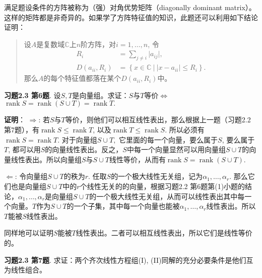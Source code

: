 满足题设条件的方阵被称为（强）对角优势矩阵（diagonally dominant matrix）。这样的矩阵都是非奇异的。如果学了方阵{\color{red}特征值}的知识，此题还可以利用如下结论证明：

\begin{quote}
设$A$是复数域$\mathbb{C}$上$n$阶方阵，对$i = 1, \ldots, n$, 令
\begin{align*}
R_{i} & = \sum_{j\neq {i}}\lvert a_{ij} \rvert, \\
D(a_{ii}, R_{i}) & = \left\{ x \in \mathbb{C} \ |\ \lvert x - a_{ii} \rvert \leqslant R_{i} \right\}.
\end{align*}
那么$A$的每个{\color{red}特征值}都落在某个$D(a_{ii}, R_{i})$中。
\end{quote}

\fi  %

\newpageorvspace

{\bf 习题2.3 第6题}. 设$S, T$是向量组。求证：$S$与$T$等价$\Longleftrightarrow$ $\operatorname{rank} S = \operatorname{rank} (S\cup T) = \operatorname{rank} T.$

\ifIncludeAnswer

\newpageorvspace

{\bf 证明}： $\Longrightarrow$: 若$S$与$T$等价，则他们可以相互线性表出，那么根据上一题（习题2.2 第7题），有$\operatorname{rank} S \leqslant \operatorname{rank} T$, 以及$\operatorname{rank} T \leqslant \operatorname{rank} S$. 所以必须有$\operatorname{rank} S = \operatorname{rank} T.$ 对于向量组$S\cup T,$ 它里面的每一个向量，要么属于$S$, 要么属于$T$, 都可以用$S$的向量线性表出。反之，$S$中每一个向量显然可以用向量组$S\cup T$的向量线性表出。所以向量组$S$与$S\cup T$线性等价，从而有$\operatorname{rank} S = \operatorname{rank} (S\cup T).$

$\Longleftarrow$: 令向量组$S\cup T$的秩为$r$. 任取$S$的一个极大线性无关组，记为$\alpha_1, \ldots, \alpha_r$. 那么它们也是向量组$S\cup T$中的$r$个线性无关的的向量，根据习题2.2 第6题第(1)小题的结论，$\alpha_1, \ldots, \alpha_r$是向量组$S\cup T$的一个极大线性无关组，从而可以线性表出其中每一个向量。$T$作为$S\cup T$的一个子集，其中每一个向量也能被$\alpha_1, \ldots, \alpha_r$线性表出。所以$T$能被$S$线性表出。

同样地可以证明$S$能被$T$线性表出。二者可以相互线性表出，所以它们是线性等价的。

\fi  %

\newpageorvspace

{\bf 习题2.3 第7题}. 求证：两个齐次线性方程组(I), (II)同解的充分必要条件是他们互为线性组合。

